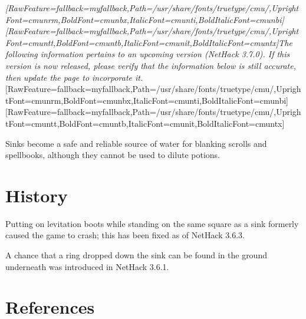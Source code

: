 {\itshape \allowbreak{}\setmainfont{cmunti.ttf}[RawFeature={fallback=myfallback},Path=/usr/share/fonts/truetype/cmu/,UprightFont=cmunrm,BoldFont=cmunbx,ItalicFont=cmunti,BoldItalicFont=cmunbi]\setmonofont{cmunti.ttf}[RawFeature={fallback=myfallback},Path=/usr/share/fonts/truetype/cmu/,UprightFont=cmuntt,BoldFont=cmuntb,ItalicFont=cmunit,BoldItalicFont=cmuntx]\itshape The following information pertains to an upcoming version (NetHack 3.7.0\footnotemark[115]). If this version is now released, please verify that the information below is still accurate, then update the page to incorporate it.}\allowbreak{}\setmainfont{cmunrm.ttf}[RawFeature={fallback=myfallback},Path=/usr/share/fonts/truetype/cmu/,UprightFont=cmunrm,BoldFont=cmunbx,ItalicFont=cmunti,BoldItalicFont=cmunbi]\setmonofont{cmunrm.ttf}[RawFeature={fallback=myfallback},Path=/usr/share/fonts/truetype/cmu/,UprightFont=cmuntt,BoldFont=cmuntb,ItalicFont=cmunit,BoldItalicFont=cmuntx]



Sinks become a safe and reliable source of water for blanking\footnotemark[116] scrolls and spellbooks, although they cannot be used to dilute potions.
\section{History}
\label{6}
Putting on levitation boots\footnotemark[117] while standing on the same square as a sink formerly caused the game to crash; this has been fixed as of NetHack 3.6.3\footnotemark[118].


A chance that a ring dropped down the sink can be found in the ground underneath was introduced in NetHack 3.6.1\footnotemark[119].

\section{References}
\label{13}

